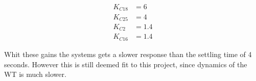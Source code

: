 \begin{equation}
	\begin{split}
	K_{C18} &= 6 \\
	K_{C25} &= 4 \\
	K_{C2} &= 1.4 \\
	K_{C16} &= 1.4
	\end{split}
	\label{eq:NEW_PI_GAINS}
\end{equation}

Whit these gains the systems gets a slower response than the settling time of 4 seconds. However this is still deemed fit to this project, since dynamics of the WT is much slower.